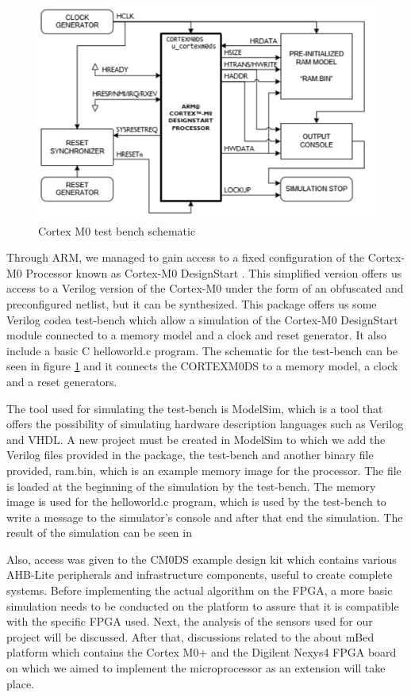 
\begin{figure}
	\centering
	\includegraphics[scale=0.7]{figures/test_bench_schematic.PNG}
	\caption{Cortex M0 test bench schematic} \label{fig:test_bench}
\end{figure}

Through ARM, we managed to gain access to a fixed configuration of the Cortex-M0 Processor known as Cortex-M0 DesignStart \cite{armdesignstart}. This simplified version offers us access to a Verilog version of the Cortex-M0 under the form of an obfuscated and preconfigured netlist, but it can be synthesized. This package offers us some Verilog codea test-bench which allow a simulation of the Cortex-M0 DesignStart module connected to a memory model and a clock and reset generator. It also include a basic C helloworld.c program. The schematic for the test-bench can be seen in figure \ref{fig:test_bench} and it connects the CORTEXM0DS to a memory model, a clock and a reset generators.

The tool used for simulating the test-bench is ModelSim, which is a tool that offers the possibility of simulating hardware description languages such as Verilog and VHDL. A new project must be created in ModelSim to which we add the Verilog files provided in the package, the test-bench and another binary file provided, ram.bin, which is an example memory image for the processor. The file is loaded at the beginning of the simulation by the test-bench.  The memory image is used for the helloworld.c program, which is used by the test-bench to write a message to the simulator's console and after that end the simulation. The result of the simulation can be seen in

Also, access was given to the CM0DS example design kit which contains various AHB-Lite peripherals and infrastructure components, useful to create complete systems. Before implementing the actual algorithm on the FPGA, a more basic simulation needs to be conducted on the platform to assure that it is compatible with the specific FPGA used. Next, the analysis of the sensors used for our project will be discussed. After that, discussions related to the about mBed platform which contains the Cortex M0+ and the Digilent Nexys4 FPGA board on which we aimed to implement the microprocessor as an extension will take place.


